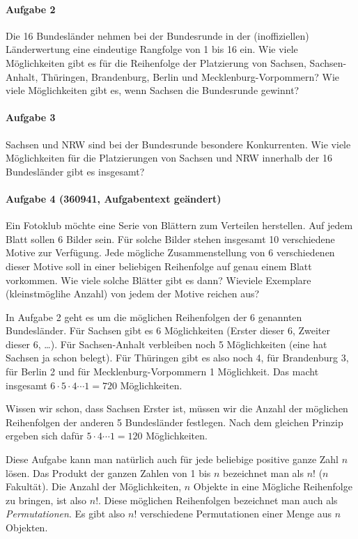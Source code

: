 \documentclass[11pt,a4paper]{article}
\begin{document}
\paragraph{Aufgabe 2} 
Die 16 Bundesländer nehmen bei der Bundesrunde in der (inoffiziellen)
Länderwertung eine eindeutige Rangfolge von 1 bis 16 ein. Wie viele
Möglichkeiten gibt es für die Reihenfolge der Platzierung von Sachsen,
Sachsen-Anhalt, Thüringen, Brandenburg, Berlin und Mecklenburg-Vorpommern? Wie
viele Möglichkeiten gibt es, wenn Sachsen die Bundesrunde gewinnt?

\paragraph{Aufgabe 3} 
Sachsen und NRW sind bei der Bundesrunde besondere Konkurrenten. Wie viele
Möglichkeiten für die Platzierungen von Sachsen und NRW innerhalb der 16
Bundesländer gibt es insgesamt?

\paragraph{Aufgabe 4 (360941, Aufgabentext geändert)} 
Ein Fotoklub möchte eine Serie von Blättern zum Verteilen herstellen. Auf
jedem Blatt sollen 6 Bilder sein. Für solche Bilder stehen insgesamt 10
verschiedene Motive zur Verfügung. Jede mögliche Zusammenstellung von 6
verschiedenen dieser Motive soll in einer beliebigen Reihenfolge auf genau
einem Blatt vorkommen. Wie viele solche Blätter gibt es dann? Wieviele
Exemplare (kleinstmöglihe Anzahl) von jedem der Motive reichen aus?  

In Aufgabe 2 geht es um die möglichen Reihenfolgen der 6 genannten
Bundesländer. Für Sachsen gibt es 6 Möglichkeiten (Erster dieser 6, Zweiter
dieser 6, \dots). Für Sachsen-Anhalt verbleiben noch 5 Möglichkeiten (eine hat
Sachsen ja schon belegt). Für Thüringen gibt es also noch 4, für Brandenburg
3, für Berlin 2 und für Mecklenburg-Vorpommern 1 Möglichkeit. Das macht
insgesamt $6\cdot 5\cdot 4\cdots 1=720$ Möglichkeiten.

Wissen wir schon, dass Sachsen Erster ist, müssen wir die Anzahl der möglichen
Reihenfolgen der anderen 5 Bundesländer festlegen. Nach dem gleichen Prinzip
ergeben sich dafür $5\cdot 4\cdots 1=120$ Möglichkeiten.

Diese Aufgabe kann man natürlich auch für jede beliebige positive ganze Zahl
$n$ lösen. Das Produkt der ganzen Zahlen von 1 bis $n$ bezeichnet man als $n!$
($n$ Fakultät). Die Anzahl der Möglichkeiten, $n$ Objekte in eine Mögliche
Reihenfolge zu bringen, ist also $n!$. Diese möglichen Reihenfolgen bezeichnet
man auch als \textit{Permutationen}. Es gibt also $n!$ verschiedene
Permutationen einer Menge aus $n$ Objekten.
\end{document}

